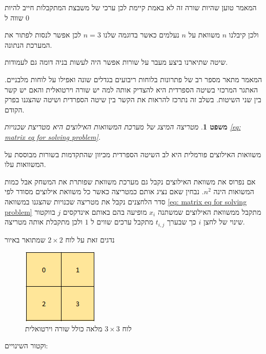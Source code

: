 \documentclass[12pt,twoside]{article}
\newtheorem{theorem}{משפט}[section]
\begin{document}
המאמר טוען שהיות שורה זה לא באמת קיימת לכן
ערכי 
של משבצת המתקבלות 
חייב להיות שווה 
ל
$0$

ולכן קיבלנו 
$n$
משוואת על 
$n$
נעלמים 
כאשר בדוגמה שלנו 
$n=3$
לכן אפשר לנסות לפתור את המערכת הנתונה.

שיטה שתיארנו ביצע מעבר על שורות אפשר היה לעשות בניה דומה גם לעמודות.

המאמר 
\cite{B1}
מתאר מספר רב של פתרונות  בלוחות ריבועים בגדלים שונה ואפילו על לוחות מלבניים.
האתגר המרכזי בשיטה הספרדית היא להצדיק אותה למה יש שורה וירטואלית
והאם יש קשר בין שני השיטות.
בשלב זה נתרכז להראות את הקשר בין שיטה הספרדית ושיטה שהצגנו בפרק הקודם.

\begin{theorem}
    מטריצה המיצג של מערכת המשוואות האילוצים היא מטריצת שכנויות
    \ref{eq: matrix eq for solving problem}.
\end{theorem}
משוואות האילוצים פורמלית היא לב השיטה הספרדית
מכיוון שהתקדמות בשורות מבוססת על המשוואות עלו.

אם נפרוס את משוואת האילוצים נקבל גם מערכת משוואת שפותרת את המשחק
אבל כמות המשואות הינה 
$n^2$.
נבחין שאם נציג אותם כמטריצה כאשר כל משוואת אילוצים מסודר לפי סדר הלחצנים נקבל את מטריצה שכנויות שהצגנו במשוואה 
\ref{eq: matrix eq for solving problem}
מתקבל ממשוואת האילוצים שמשתנה 
$x_i$
מופיעה בהם
באותם אינדקסים 
$j$
בווקטור שינוי
של לחצן 
$i$
כך שבערך 
$t_{i,j}$
מתקבל ערכים 
שווים
ל
$1$
ולכן מתקבלת אותה מטריצה.

נדגים זאת על לוח 
$2 \times 2$
שמתואר באיור 

\begin{figure}[ht]
    \caption{לוח 
    $3 \times 3$
    מלאה
    כולל שורה וירטואלית
    }
    \label{fig: 2 x 2 board}
    \centering
    \includegraphics[width=.3\textwidth,height=.3\textheight,keepaspectratio]{images/2x2_board.PNG}
\end{figure}

וקטור השינויים:
\end{document}
